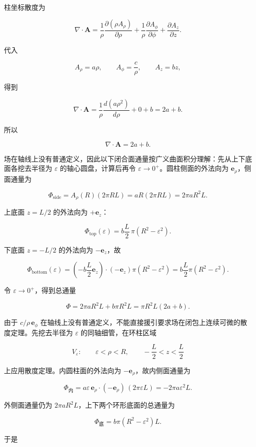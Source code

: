 柱坐标散度为

\[
\nabla\cdot\mathbf A
=\frac1\rho\frac{\partial(\rho A_{\rho})}{\partial\rho}
+\frac1\rho\frac{\partial A_{\phi}}{\partial\phi}
+\frac{\partial A_z}{\partial z}.
\]

代入

\[
A_{\rho}=a\rho,
\qquad
A_{\phi}=\frac c\rho,
\qquad
A_z=bz,
\]

得到

\[
\nabla\cdot\mathbf A
=\frac1\rho\frac{d(a\rho^2)}{d\rho}
+0+b
=2a+b.
\]

所以

\[
\boxed{\nabla\cdot\mathbf A=2a+b}.
\]

场在轴线上没有普通定义，因此以下闭合面通量按广义曲面积分理解：先从上下底面各挖去半径为
\(\varepsilon\) 的轴心圆盘，计算后再令
\(\varepsilon\to0^+\)。圆柱侧面的外法向为
\(\mathbf e_{\rho}\)，侧面通量为

\[
\Phi_{\mathrm{side}}
=A_{\rho}(R)(2\pi RL)
=aR(2\pi RL)
=2\pi aR^2L.
\]

上底面 \(z=L/2\) 的外法向为 \(+\mathbf e_z\)：

\[
\Phi_{\mathrm{top}}(\varepsilon)
=b\frac L2\,\pi\left(R^2-\varepsilon^2\right).
\]

下底面 \(z=-L/2\) 的外法向为 \(-\mathbf e_z\)，故

\[
\Phi_{\mathrm{bottom}}(\varepsilon)
=\left(-b\frac L2\mathbf e_z\right)
\cdot(-\mathbf e_z)\pi\left(R^2-\varepsilon^2\right)
=b\frac L2\pi\left(R^2-\varepsilon^2\right).
\]

令 \(\varepsilon\to0^+\)，得到总通量

\[
\Phi
=2\pi aR^2L+b\pi R^2L
=\pi R^2L(2a+b).
\]

由于 \(c/\rho\,\mathbf e_{\phi}\)
在轴线上没有普通定义，不能直接援引要求场在闭包上连续可微的散度定理。先挖去半径为
\(\varepsilon\) 的同轴细管，在环柱区域

\[
V_{\varepsilon}:\qquad
\varepsilon<\rho<R,
\qquad
-\frac L2<z<\frac L2
\]

上应用散度定理。内圆柱面的外法向为 \(-\mathbf e_{\rho}\)，故内侧面通量为

\[
\Phi_{\mathrm{\text{内}}}
=a\varepsilon\,\mathbf e_{\rho}\cdot(-\mathbf e_{\rho})
\,(2\pi\varepsilon L)
=-2\pi a\varepsilon^2L.
\]

外侧面通量仍为 \(2\pi aR^2L\)，上下两个环形底面的总通量为

\[
\Phi_{\mathrm{\text{底}}}
=b\pi\left(R^2-\varepsilon^2\right)L.
\]

于是

